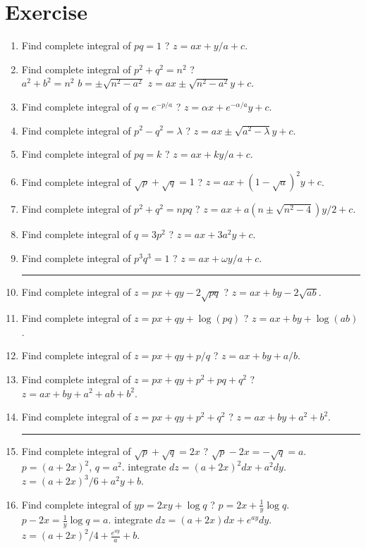 \section*{Exercise}
\begin{enumerate}
	\item Find complete integral of $pq = 1$ ?
	$z = ax + y/a + c$.
	\item Find complete integral of $p^2 + q^2 = n^2$ ?\\
	$a^2 + b^2 = n^2$  $b = \pm \sqrt{n^2-a^2}$
	$z = ax \pm \sqrt{n^2-a^2}y + c$.
	\item Find complete integral of $q = e^{-p/a}$ ?
	$z = \alpha x + e^{-\alpha/a} y + c$.
	\item Find complete integral of $p^2 - q^2 = \lambda$ ?
	$z = ax \pm \sqrt{a^2-\lambda}y + c$.
	\item Find complete integral of $pq = k$ ?
	$z = ax + ky/a + c$.
	\item Find complete integral of $\sqrt{p} + \sqrt{q} = 1$ ?
	$z = ax + (1-\sqrt{a})^2y + c$.
	\item Find complete integral of $p^2 + q^2 = npq$ ?
	$z = ax + a(n \pm \sqrt{n^2-4})y/2 + c$.
	\item Find complete integral of $q = 3p^2$ ?
	$z = ax + 3a^2y + c$.
	\item Find complete integral of $p^3q^3 = 1$ ?
	$z = ax + \omega y/a + c$.\\
	\hrule
	\item Find complete integral of $z = px + qy -2\sqrt{pq}$ ? $z = ax + by - 2\sqrt{ab}$.
	\item Find complete integral of $z = px + qy + \log(pq)$ ? $z = ax + by + \log(ab)$.
	\item Find complete integral of $z = px + qy + p/q$ ? $z = ax + by + a/b$.
	\item Find complete integral of $z = px + qy + p^2 + pq + q^2$ ? $z = ax + by + a^2 + ab + b^2$.
	\item Find complete integral of $z = px + qy + p^2 + q^2$ ? $z = ax + by + a^2 + b^2$.\\
	\hrule
	\item Find complete integral of $\sqrt{p} + \sqrt{q} = 2x$ ?
	$\sqrt{p}-2x = -\sqrt{q} = a$.
	$p = (a+2x)^2$, $q = a^2$.
	integrate $dz = (a+2x)^2 dx + a^2 dy$.
	$z = (a+2x)^3/6 + a^2y + b$.
	\item Find complete integral of $yp = 2xy+\log q$ ?
	$p = 2x +\frac{1}{y}\log q$. $p-2x = \frac{1}{y}\log q = a$.
	integrate $dz = (a+2x)dx + e^{ay}dy$.
	$z = (a+2x)^2/4 + \frac{e^{ay}}{a} + b$.

\end{enumerate}

